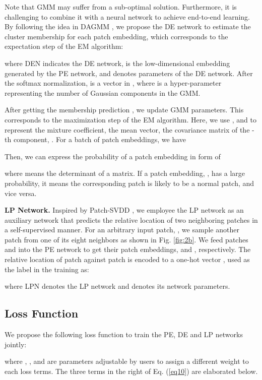 \documentclass{article}
\begin{document}
Note that GMM may suffer from a sub-optimal solution. Furthermore, it is
challenging to combine it with a neural network to achieve end-to-end
learning. By following the idea in DAGMM \cite{zong2018deep}, we propose
the DE network to estimate the cluster membership for each patch
embedding, which corresponds to the expectation step of the EM algorithm:

where DEN indicates the DE network,  is the low-dimensional
embedding generated by the PE network, and  denotes
parameters of the DE network. After the softmax normalization,
 is a vector in , where  is a
hyper-parameter representing the number of Gaussian components in the
GMM. 

After getting the membership prediction , we update GMM
parameters. This corresponds to the maximization step of the EM
algorithm.  Here, we use ,  and  to
represent the mixture coefficient, the mean vector, the covariance
matrix of the -th component, . For a batch of 
patch embeddings, we have

Then, we can express the probability of a patch embedding  in form of

where  means the determinant of a matrix. If a patch embedding,
, has a large probability, it means the corresponding patch
is likely to be a normal patch, and vice versa. 


{\bf LP Network.} Inspired by Patch-SVDD \cite{yi2020patch}, we
employee the LP network as an auxiliary network that predicts the
relative location of two neighboring patches in a self-supervised
manner. 
For an arbitrary input patch, , we sample another patch
 from one of its eight neighbors as shown in
Fig. \ref{fig:2b}. We feed patches  and  into
the PE network to get their patch embeddings,  and ,
respectively. The relative location of patch  against 
patch  is encoded to a one-hot vector , 
used as the label in the training as:

where LPN denotes the LP network and  denotes its
network parameters. 

\subsection{Loss Function}\label{subsec:loss}

We propose the following loss function to train the PE, DE and LP 
networks jointly:

where , , and  are parameters adjustable
by users to assign a different weight to each loss terms. The three
terms in the right of Eq. (\ref{eq10}) are elaborated below.
\end{document}
